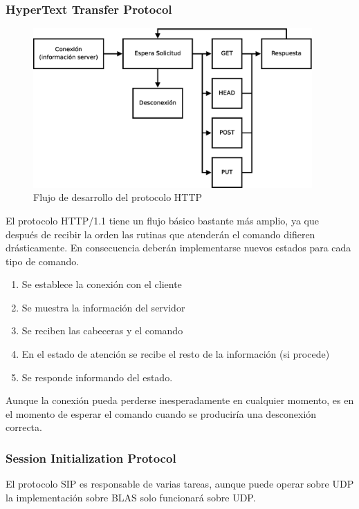 \documentclass[a4paper,spanish,12pt]{book}
\begin{document}
\subsubsection{HyperText Transfer Protocol}
\begin{figure}[h]
	\includegraphics[width=0.95\textwidth]{img/DiagramaFlujoHTTP.eps}
              \caption{Flujo de desarrollo del protocolo HTTP}
  \label{fig:DiagramaFlujoHTTP}
\end{figure}
El protocolo HTTP/1.1 tiene un flujo básico bastante más amplio, ya que después de recibir la orden las rutinas que atenderán el comando difieren drásticamente. En consecuencia deberán implementarse nuevos estados para cada tipo de comando.
\begin{enumerate}
	\item Se establece la conexión con el cliente
	\item Se muestra la información del servidor
	\item Se reciben las cabeceras y el comando
	\item En el estado de atención se recibe el resto de la información (si procede)
	\item Se responde informando del estado.
\end{enumerate}
Aunque la conexión pueda perderse inesperadamente en cualquier momento, es en el momento de esperar el comando cuando se produciría una desconexión correcta.
\subsubsection{Session Initialization Protocol}
El protocolo SIP es responsable de varias tareas, aunque puede operar sobre UDP la implementación sobre BLAS solo funcionará sobre UDP.
\end{document}
